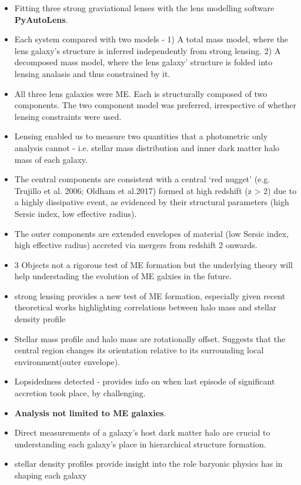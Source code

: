 \documentclass{article}
\begin{document}
\begin{itemize}
    \item Fitting three strong graviational lenses with the lens modelling software \textbf{PyAutoLens}. 
    \item Each system compared with two models - 1) A total mass model, where the lens galaxy's structure is inferred independently from strong lensing. 2) A decomposed mass model, where the lens galaxy' structure is folded into lensing analasis and thus constrained by it.
    \item All three lens galaxies were ME. Each is structurally composed of two components. The two component model was preferred, irrespective of whether lensing constraints were used.
    \item Lensing enabled us to measure two quantities that a photometric only analysis cannot - i.e. stellar mass distribution and inner dark matter halo mass of each galaxy.
    \item The central components are consistent with a central ‘red nugget’ (e.g. Trujillo et al. 2006; Oldham et al.2017) formed at high redshift (z > 2) due to a highly dissipative event, as evidenced by their structural parameters (high Sersic index, low effective radius).
    \item The outer components are extended envelopes of material (low Sersic index, high effective radius) accreted via mergers from redshift 2 onwards.
    \item 3 Objects not a rigorous test of ME formation but the underlying theory will help understading the evolution of ME galxies in the future.
    \item strong lensing provides a new test of ME formation, especially given recent theoretical works highlighting correlations between halo mass and stellar density profile
    \item Stellar mass profile and halo mass are rotationally offset. Suggests that the central region changes its orientation relative to its surrounding local environment(outer envelope).
    \item Lopsidedness detected - provides info on when last episode of significant accretion took place, by challenging.
    \item \textbf{Analysis not limited to ME galaxies}.
    \item Direct measurements of a galaxy’s host dark matter halo are crucial to understanding each galaxy’s place in hierarchical structure formation.
    \item stellar density profiles provide insight into the role baryonic physics has in shaping each galaxy
\end{itemize}
\end{document}
